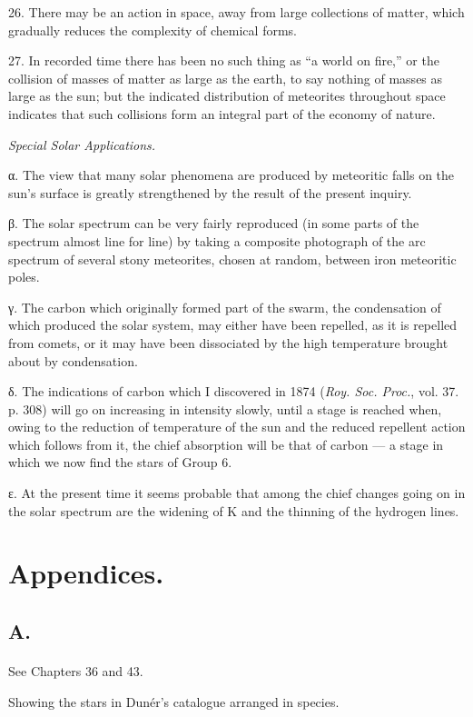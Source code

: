 \documentclass[a4paper, 12pt, oneside, polutonikogreek, english]{article}
\begin{document}
26. There may be an action in space, away from large collections of matter, which gradually reduces the complexity of chemical forms.

27. In recorded time there has been no such thing as ``a world on fire,'' or the collision of masses of matter as large as the earth, to say nothing of masses as large as the sun; but the indicated distribution of meteorites throughout space indicates that such collisions form an integral part of the economy of nature.

\emph{Special Solar Applications.}

α. The view that many solar phenomena are produced by meteoritic falls on the sun's surface is greatly strengthened by the result of the present inquiry.

β. The solar spectrum can be very fairly reproduced (in some parts of the spectrum almost line for line) by taking a composite photograph of the arc spectrum of several stony meteorites, chosen at random, between iron meteoritic poles.

γ. The carbon which originally formed part of the swarm, the condensation of which produced the solar system, may either have been repelled, as it is repelled from comets, or it may have been dissociated by the high temperature brought about by condensation.

δ. The indications of carbon which I discovered in 1874 (\emph{Roy. Soc. Proc.}, vol. 37. p. 308) will go on increasing in intensity slowly, until a stage is reached when, owing to the reduction of temperature of the sun and the reduced repellent action which follows from it, the chief absorption will be that of carbon --- a stage in which we now find the stars of Group 6.

ε. At the present time it seems probable that among the chief changes going on in the solar spectrum are the widening of K and the thinning of the hydrogen lines.
\clearpage
\section{Appendices.}
\subsection{A.}
\paragraph{}
See Chapters 36 and 43.

Showing the stars in Dunér's catalogue arranged in species.
\end{document}
